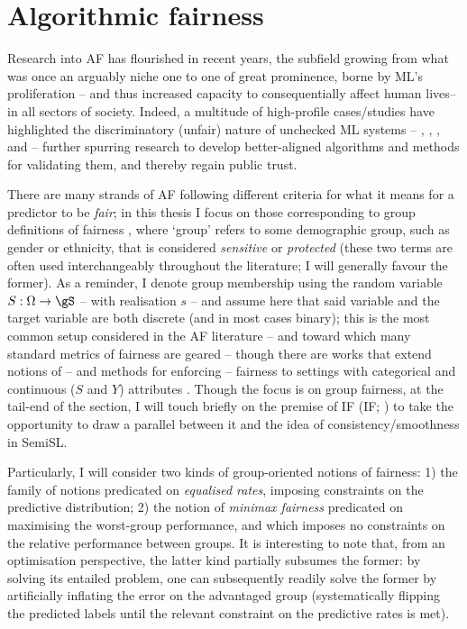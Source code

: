 \section{Algorithmic fairness}\label{sec:af}
Research into \acf{AF} has flourished in recent years, the subfield growing from what was once an
arguably niche one to one of great prominence, borne by \ac{ML}'s proliferation -- and thus
increased capacity to consequentially affect human lives-- in all sectors of society.
%
Indeed, a multitude of high-profile cases/studies have highlighted the discriminatory (unfair)
nature of unchecked \ac{ML} systems -- \citet{kasperkevic2015google}, \citet{angwin2016machine},
\citet{dastin2018amazon}, and \citet{buolamwini2018gender} -- further spurring research to develop
better-aligned algorithms and methods for validating them, and thereby regain public trust.

%
There are many strands of \ac{AF} following different criteria for what it means for a predictor to
be \emph{fair}; in this thesis I focus on those corresponding to group definitions of fairness
\citep{barocas2019fairness}, where `group' refers to some demographic group, such as gender or
ethnicity, that is considered \emph{sensitive} or \emph{protected} (these two terms are often used
interchangeably throughout the literature; I will generally favour the former).
%
As a reminder, I denote group membership using the random variable \( S: \Omega \to \gS \) -- with
realisation \(s\) -- and assume here that said variable and the target variable are both discrete
(and in most cases binary); this is the most common setup considered in the \ac{AF} literature --
and toward which many standard metrics of fairness are geared \citep{feldman2015certifying,
hardt2016equality, woodworth2017learning} -- though there are works that extend notions of -- and
methods for enforcing -- fairness to settings with categorical and continuous (\( S \) and \( Y \))
attributes \citep{grari2021fairness}.
%
Though the focus is on group fairness, at the tail-end of the section, I will touch briefly on the
premise of \acl{IF} (\acs{IF}; \citealp{dwork2012fairness}) to take the opportunity to draw a
parallel between it and the idea of consistency/smoothness in \ac{SemiSL}.

%
Particularly, I will consider two kinds of group-oriented notions of fairness: 1) the family of
notions predicated on \emph{equalised rates}, imposing constraints on the predictive distribution;
2) the notion of \emph{minimax fairness} predicated on maximising the worst-group performance, and
which imposes no constraints on the relative performance between groups.
%
It is interesting to note that, from an optimisation perspective, the latter kind partially
subsumes the former: by solving its entailed problem, one can subsequently readily solve the former
by artificially inflating the error on the advantaged group (systematically flipping the predicted
labels until the relevant constraint on the predictive rates is met).

